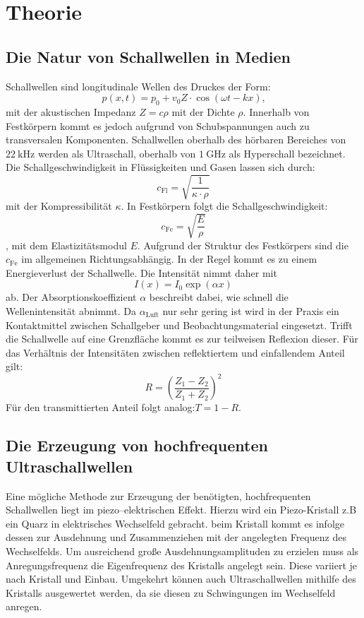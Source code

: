 
\section{Theorie}
\label{sec:Theorie}
\subsection{Die Natur von Schallwellen in Medien}
Schallwellen sind longitudinale Wellen des Druckes der Form:
\begin{equation}
  p \left( x , t \right) = p_0 + v_0 Z \cdot \cos \left(\omega t -kx \right)\text{,}\label{eq:Schallwelle}
  \end{equation}
mit der akustischen Impedanz $Z = c \rho$ mit der Dichte $\rho$. Innerhalb von Festkörpern kommt es jedoch
aufgrund von Schubspannungen auch zu transversalen Komponenten.
Schallwellen oberhalb des hörbaren Bereiches von $\SI{22}{\kilo\hertz}$ werden als
Ultraschall, oberhalb von $\SI{1}{\giga\hertz}$ als Hyperschall bezeichnet. Die
Schallgeschwindigkeit in Flüssigkeiten und Gasen lassen sich durch:
\begin{equation}
  c_\text{Fl} = \sqrt{\frac{1}{\kappa \cdot \rho}}\label{Fl}
\end{equation}
mit der Kompressibilität $\kappa$. In Festkörpern folgt die Schallgeschwindigkeit:
\begin{equation}
  c_\text{Fe} = \sqrt{\frac{E}{\rho}}\label{Fe}
\end{equation}
, mit dem Elastizitätsmodul $E$.
Aufgrund der Struktur des Festkörpers sind die $c_\text{Fe}$ im allgemeinen Richtungsabhängig.
In der Regel kommt es zu einem Energieverlust der Schallwelle. Die Intensität nimmt daher mit
\begin{equation}
  I\left(x\right) = I_0 \exp\left(\alpha x\right)\label{I}
\end{equation}
ab. Der Absorptionskoeffizient $\alpha$ beschreibt dabei, wie schnell die Wellenintensität
abnimmt. Da $\alpha_\text{Luft}$ nur sehr gering ist wird in der Praxis ein Kontaktmittel
zwischen Schallgeber und Beobachtungsmaterial eingesetzt.
Trifft die Schallwelle auf eine Grenzfläche kommt es zur teilweisen Reflexion dieser.
Für das Verhältnis der Intensitäten zwischen reflektiertem und einfallendem Anteil gilt:
\begin{equation}
  R = \left(\frac{Z_1-Z_2}{Z_1+Z_2}\right)^2
\end{equation}
Für den transmittierten Anteil folgt analog:$ T = 1-R $.
\subsection{Die Erzeugung von hochfrequenten Ultraschallwellen}
Eine mögliche Methode zur Erzeugung der benötigten, hochfrequenten Schallwellen
liegt im piezo--elektrischen Effekt. Hierzu wird ein Piezo-Kristall z.B ein Quarz
in elektrisches Wechselfeld gebracht. beim Kristall kommt es infolge dessen zur
Ausdehnung und Zusammenziehen mit der angelegten Frequenz des Wechselfelds. Um
ausreichend große Ausdehnungsamplituden zu erzielen muss als Anregungsfrequenz
die Eigenfrequenz des Kristalls angelegt sein. Diese variiert je nach Kristall
und Einbau. Umgekehrt können auch Ultraschallwellen mithilfe des Kristalls
ausgewertet werden, da sie diesen zu Schwingungen im Wechselfeld anregen.
